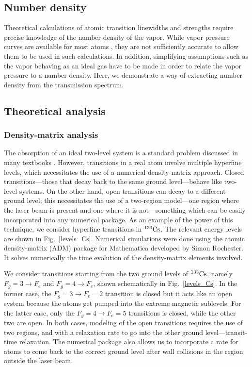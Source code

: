 \begin{enumerate}
\chapter{Number density}

Theoretical calculations of atomic transition linewidths  \cite{IFN09,CSB11,CHN13,CPB14} and strengths \cite{RTC98,MES99,FOO05} require precise knowledge of the number density of the vapor. While vapor pressure curves are available for most atoms \cite{STE03}, they are not sufficiently accurate to allow them to be used in such calculations. In addition, simplifying assumptions such as the vapor behaving as an ideal gas have to be made in order to relate the vapor pressure to a number density. Here, we demonstrate a way of extracting number density from the transmission spectrum.

	
\section{Theoretical analysis}
	\subsection{Density-matrix analysis}
	The absorption of an ideal two-level system is a standard problem discussed in many textbooks \cite{ALE75}. However, transitions in a real atom involve multiple hyperfine levels, which necessitates the use of a numerical density-matrix approach. Closed transitions---those that decay back to the same ground level---behave like two-level systems. On the other hand, open transitions can decay to a different ground level; this necessitates the use of a two-region model---one region where the laser beam is present and one where it is not---something which can be easily incorporated into any numerical package. As an example of the power of this technique, we consider hyperfine transitions in $\rm ^{133}Cs$. The relevant energy levels are shown in Fig.~\ref{levels_Cs}.  Numerical simulations were done using the atomic density-matrix (ADM) package for Mathematica developed by Simon Rochester. It solves numerically the time evolution of the density-matrix elements involved.
	
	We consider transitions starting from the two ground levels of $\rm ^{133}Cs$, namely $ F_g = 3 \rightarrow F_e $ and $ F_g = 4 \rightarrow F_e $, shown schematically in Fig.~\ref{levels_Cs}. In the former case, the $ F_g = 3 \rightarrow F_e = 2 $ transition is closed but it acts like an open system because the atoms get pumped into the extreme magnetic sublevels. For the latter case, only the $ F_g = 4 \rightarrow F_e = 5 $ transitions is closed, while the other two are open. In both cases, modeling of the open transitions requires the use of two regions, and with a relaxation rate to go into the other ground level---transit-time relaxation. The numerical package also allows us to incorporate a rate for atoms to come back to the correct ground level after wall collisions in the region outside the laser beam.
	

\end{enumerate}
